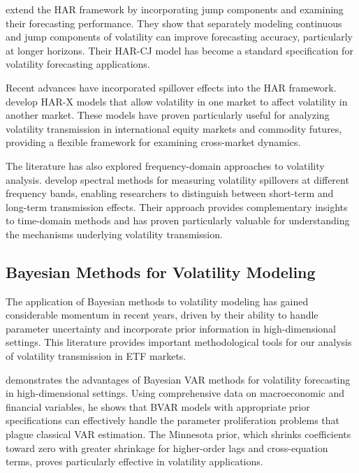 \citet{andersen2007roughing} extend the HAR framework by incorporating jump components and examining their forecasting performance. They show that separately modeling continuous and jump components of volatility can improve forecasting accuracy, particularly at longer horizons. Their HAR-CJ model has become a standard specification for volatility forecasting applications.

Recent advances have incorporated spillover effects into the HAR framework. \citet{bubak2011volatility} develop HAR-X models that allow volatility in one market to affect volatility in another market. These models have proven particularly useful for analyzing volatility transmission in international equity markets and commodity futures, providing a flexible framework for examining cross-market dynamics.

The literature has also explored frequency-domain approaches to volatility analysis. \citet{barunik2018measuring} develop spectral methods for measuring volatility spillovers at different frequency bands, enabling researchers to distinguish between short-term and long-term transmission effects. Their approach provides complementary insights to time-domain methods and has proven particularly valuable for understanding the mechanisms underlying volatility transmission.

\subsection{Bayesian Methods for Volatility Modeling}

The application of Bayesian methods to volatility modeling has gained considerable momentum in recent years, driven by their ability to handle parameter uncertainty and incorporate prior information in high-dimensional settings. This literature provides important methodological tools for our analysis of volatility transmission in ETF markets.

\citet{koop2011forecasting} demonstrates the advantages of Bayesian VAR methods for volatility forecasting in high-dimensional settings. Using comprehensive data on macroeconomic and financial variables, he shows that BVAR models with appropriate prior specifications can effectively handle the parameter proliferation problems that plague classical VAR estimation. The Minnesota prior, which shrinks coefficients toward zero with greater shrinkage for higher-order lags and cross-equation terms, proves particularly effective in volatility applications.

